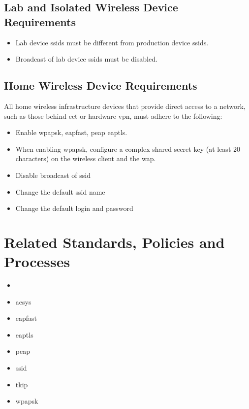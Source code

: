 \subsection{Lab and Isolated Wireless Device Requirements}
\begin{itemize}
\item
Lab device \glspl{ssid} must be different from \CompanyName{} production device \glspl{ssid}.
\item
Broadcast of lab device \glspl{ssid} must be disabled.
\end{itemize}
\subsection{Home Wireless Device Requirements}
All home wireless infrastructure devices that provide direct access to a \CompanyName{} network, such as those behind \gls{ect} or hardware \gls{vpn}, must adhere to the following: 
\begin{itemize}
\item
Enable \gls{wpapsk}, \gls{eapfast}, \gls{peap}\oxford{} \gls{eaptls}.
\item
When enabling \gls{wpapsk}, configure a complex shared secret key (at least 20 characters) on the wireless client and the \gls{wap}.
\item
Disable broadcast of \gls{ssid}
\item
Change the default \gls{ssid} name
\item
Change the default login and password
\end{itemize}
\CommonPolicyCompliance
\section{Related Standards, Policies\oxford{} and Processes}
\begin{itemize}
\item {}
\end{itemize}
\CommonDefinitionsAndTerms
\begin{itemize}
\item \gls{aesys}
\item \gls{eapfast}
\item \gls{eaptls}
\item \gls{peap}
\item \gls{ssid}
\item \gls{tkip}
\item \gls{wpapsk}
\end{itemize}
\CommonRevisionHistory